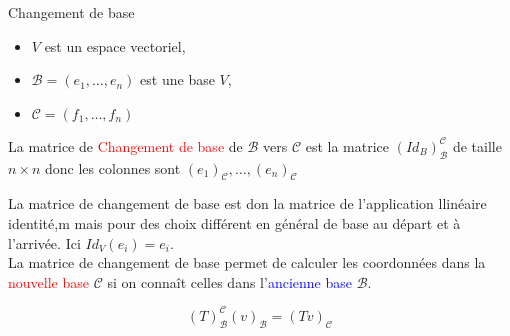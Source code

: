 \begin{parag}{Changement de base}
\begin{itemize}
    \item $V$ est un espace vectoriel,
    \item $\mathcal{B} = \left(e_1, \dots, e_n\right)$ est une base $V$,
    \item $\mathcal{C} = \left(f_1, \dots,f_n \right)$
\end{itemize}
        \begin{definition}
            La matrice de \textcolor{red}{Changement de base} de $\mathcal{B}$ vers $\mathcal{C}$ est la matrice $\left(Id_B\right)_{\mathcal{B}}^{\mathcal{C}}$ de taille $n \times n$ donc les colonnes sont $\left(e_1\right)_{\mathcal{C}}, \dots, \left(e_n\right)_{\mathcal{C}}$
        \end{definition}
        La matrice de changement de base est don la matrice de l'application llinéaire identité,m mais pour des choix différent en général de base au départ et à l'arrivée. Ici $Id_V\left(e_i\right) = e_i$.
\\

La matrice de changement de base permet de calculer les coordonnées dans la \textcolor{red}{nouvelle base} $\mathcal{C}$ si on connaît celles dans l'\textcolor{blue}{ancienne base } $\mathcal{B}$.
        \begin{theoreme}
        \[\left(T\right)_{\mathcal{B}}^{\mathcal{C}}\left(v\right)_{\mathcal{B}} = \left(Tv\right)_{\mathcal{C}}\]
        \end{theoreme}


\end{parag}
